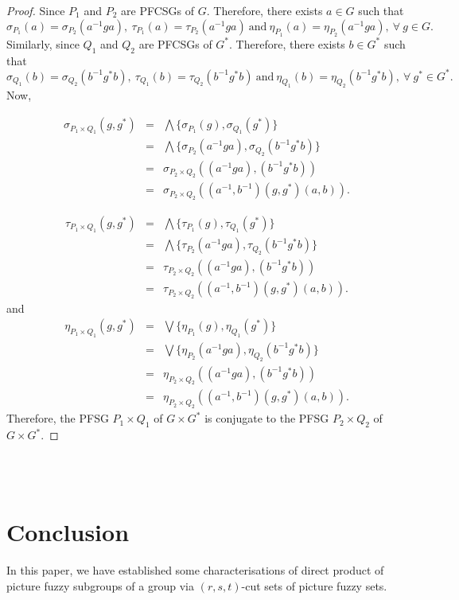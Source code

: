 \documentclass[12pt,letterpaper]{amsart}
\theoremstyle{plain}
\theoremstyle{definition}
\numberwithin{equation}{section}
\begin{document}
\begin{proof}
Since $P_1$ and $P_2$ are PFCSGs of $G.$ Therefore, there exists $a \in G$ such that $$\sigma_{P_1}(a) = \sigma_{P_2}(a^{-1} g a),~ \tau_{P_1}(a) = \tau_{P_2}(a^{-1} g a)~ \text{and}~ \eta_{P_1}(a) = \eta_{P_2}(a^{-1} g a),~ \forall~ g \in G.$$ Similarly, since $Q_1$ and $Q_2$ are PFCSGs of $G^*.$ Therefore, there exists $b \in G^*$ such that $$\sigma_{Q_1}(b) = \sigma_{Q_2}(b^{-1} g^* b),~ \tau_{Q_1}(b) = \tau_{Q_2}(b^{-1} g^* b)~ \text{and}~ \eta_{Q_1}(b) = \eta_{Q_2}(b^{-1} g^* b),~ \forall~ g^* \in G^*.$$ Now,  

\begin{eqnarray*}
\sigma_{P_1 \times Q_1}(g, g^*) & = & \bigwedge \lbrace \sigma_{P_1}(g), \sigma_{Q_1}(g^*) \rbrace\\
& = & \bigwedge\lbrace \sigma_{P_2}(a^{-1}ga), \sigma_{Q_2}(b^{-1}g^*b) \rbrace\\
& = &  \sigma_{P_2 \times Q_2}((a^{-1}ga), (b^{-1}g^*b))\\
& = &  \sigma_{P_2 \times Q_2}((a^{-1}, b^{-1}) (g, g^*)(a, b)). 
\end{eqnarray*}

\begin{eqnarray*}
\tau_{P_1 \times Q_1}(g, g^*) & = & \bigwedge \lbrace \tau_{P_1}(g), \tau_{Q_1}(g^*) \rbrace\\
& = & \bigwedge\lbrace \tau_{P_2}(a^{-1}ga), \tau_{Q_2}(b^{-1}g^*b) \rbrace\\
& = &  \tau_{P_2 \times Q_2}((a^{-1}ga), (b^{-1}g^*b))\\
& = &  \tau_{P_2 \times Q_2}((a^{-1}, b^{-1}) (g, g^*)(a, b)). 
\end{eqnarray*}
and 
\begin{eqnarray*}
\eta_{P_1 \times Q_1}(g, g^*) & = & \bigvee \lbrace \eta_{P_1}(g), \eta_{Q_1}(g^*) \rbrace\\
& = & \bigvee\lbrace \eta_{P_2}(a^{-1}ga), \eta_{Q_2}(b^{-1}g^*b) \rbrace\\
& = &  \eta_{P_2 \times Q_2}((a^{-1}ga), (b^{-1}g^*b))\\
& = &  \eta_{P_2 \times Q_2}((a^{-1}, b^{-1}) (g, g^*)(a, b)). 
\end{eqnarray*}
Therefore, the PFSG $P_1 \times Q_1$ of $G \times G^*$ is conjugate to the PFSG $P_2 \times Q_2$ of $G \times G^*.$
\end{proof}


\ \\ \ \\

\section*{Conclusion}
In this paper, we have established some characterisations of direct product of picture fuzzy subgroups of a group via  $(r, s, t)$-cut sets of picture fuzzy sets. 
\ \\ \ \\ \ \\
\end{document}
